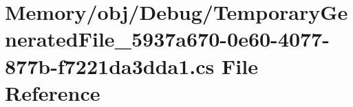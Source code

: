 \hypertarget{_memory_2obj_2_debug_2_temporary_generated_file__5937a670-0e60-4077-877b-f7221da3dda1_8cs}{}\section{Memory/obj/\+Debug/\+Temporary\+Generated\+File\+\_\+5937a670-\/0e60-\/4077-\/877b-\/f7221da3dda1.cs File Reference}
\label{_memory_2obj_2_debug_2_temporary_generated_file__5937a670-0e60-4077-877b-f7221da3dda1_8cs}
